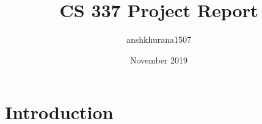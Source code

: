\documentclass{article}
\title{CS 337 Project Report}
\author{anshkhurana1507 }
\date{November 2019}
\begin{document}
\maketitle

\section{Introduction}
\end{document}
